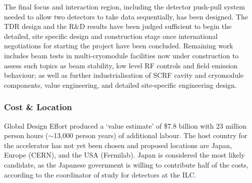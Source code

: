 The final focus and interaction region, including the detector push-pull system needed to allow two detectors to take data sequentially, has been designed. The TDR design and the R\&D results have been judged sufficient to begin the detailed, site specific design and construction stage once international negotiations for starting the project have been concluded. Remaining work includes beam tests in multi-cryomodule facilities now under construction to assess such topics as beam stability, low level RF controls and field emission behaviour; as well as further industrialisation of SCRF cavity and cryomodule components, value engineering, and detailed site-specific engineering design. \cite{ILC:OtherReport}
 
\subsubsection{Cost \& Location}


Global Design Effort produced a `value estimate' of \$7.8 billion with 23 million person hours ($\sim$13,000 person years) of additional labour.
The host country for the accelerator has not yet been chosen and proposed locations are Japan, Europe (CERN), and the USA (Fermilab). Japan is considered the most likely candidate, as the Japanese government is willing to contribute half of the costs, according to the coordinator of study for detectors at the ILC.